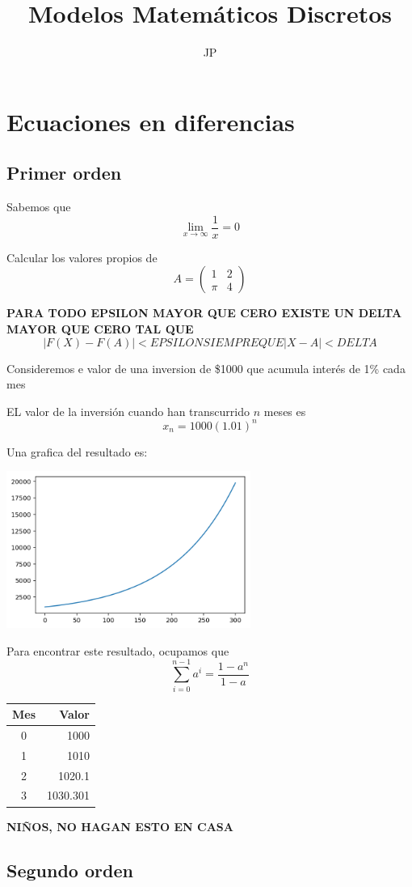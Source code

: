 \documentclass{article}
\title{Modelos Matemáticos Discretos}
\author{JP}
\begin{document}
\maketitle
\section{Ecuaciones en diferencias}
\subsection{Primer orden}

Sabemos que $$\lim_{x\to\infty}\frac{1}{x}=0$$

Calcular los valores propios de $$A=
\begin{pmatrix}
1 & 2 \\
\pi & 4
\end{pmatrix}
$$

\huge
\textbf{PARA TODO EPSILON MAYOR QUE CERO EXISTE UN DELTA MAYOR QUE CERO TAL QUE $$|F(X)-F(A)|<EPSILON SIEMPRE QUE |X-A|< DELTA$$}



Consideremos e valor de una inversion de \$1000 que acumula interés de 1\% cada mes

EL valor de la inversión cuando han transcurrido $n$ meses es $$x_n=1000(1.01)^n$$

Una grafica del resultado es:

\begin{center}
\includegraphics[width=8cm]{grafica}
\end{center}

Para encontrar este resultado, ocupamos que
$$\sum_{i=0}^{n-1}a^i=\frac{1-a^n}{1-a}$$

\begin{center}
\begin{tabular}{|c|r|}
\hline
Mes & Valor \\
\hline 
0 & 1000 \\
\hline 
1 & 1010 \\
\hline 
2 & 1020.1 \\
\hline 
3 & 1030.301 \\
\hline 
\end{tabular}

\huge
\textbf{NIÑOS, NO HAGAN ESTO EN CASA}
\end{center}

\subsection{Segundo orden}
\end{document}

